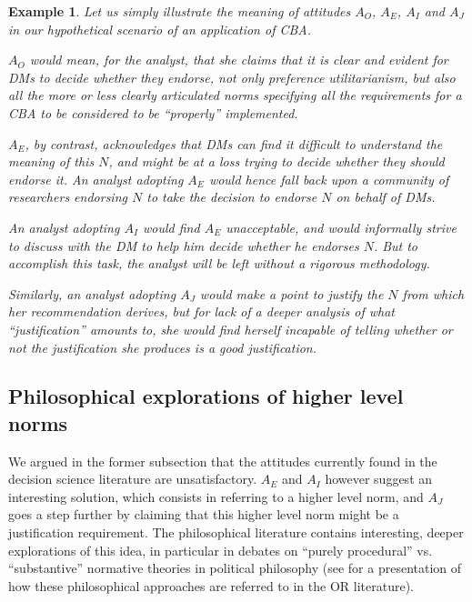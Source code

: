 \documentclass[preprint, french, english, 11pt, authoryear]{elsarticle}%
\newtheorem{example}{Example}
\begin{document}
\begin{example}
Let us simply illustrate the meaning of attitudes $A_O$, $A_E$, $A_I$ and $A_J$ in our hypothetical scenario of an application of \ac{CBA}.

$A_O$ would mean, for the analyst, that she claims that it is clear and evident for \acp{DM} to decide whether they endorse, not only preference utilitarianism, but also all the more or less clearly articulated norms specifying all the requirements for a \ac{CBA} to be considered to be ``properly'' implemented.

$A_E$, by contrast, acknowledges that \acp{DM} can find it difficult to understand the meaning of this $N$, and might be at a loss trying to decide whether they should endorse it. 
An analyst adopting $A_E$ would hence fall back upon a community of researchers endorsing $N$ to take the decision to endorse $N$ on behalf of \acp{DM}.

An analyst adopting $A_I$ would find $A_E$ unacceptable, and would informally strive to discuss with the \ac{DM} to help him decide whether he endorses $N$. But to accomplish this task, the analyst will be left without a rigorous methodology.

Similarly, an analyst adopting $A_J$ would make a point to justify the $N$ from which her recommendation derives, but for lack of a deeper analysis of what ``justification'' amounts to, she would find herself incapable of telling whether or not the justification she produces is a good justification.

\end{example}

\subsection{Philosophical explorations of higher level norms}
\label{sec:higher}
We argued in the former subsection that the attitudes currently found in the decision science literature are unsatisfactory. 
$A_E$ and $A_I$ however suggest an interesting solution, which consists in referring to a higher level norm, and $A_J$ goes a step further by claiming that this higher level norm might be a justification requirement.
The philosophical literature contains interesting, deeper explorations of this idea, in particular in debates on “purely procedural” vs. “substantive” normative theories in political philosophy (see \citet{white_challenge_2009} for a presentation of how these philosophical approaches are referred to in the \ac{OR} literature).
\end{document}
